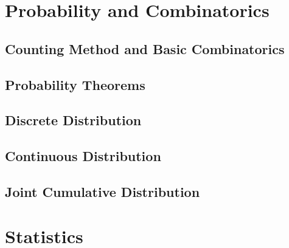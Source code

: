 \documentclass[
	12pt, %
	fleqn, %
	a4paper, %
]{LegrandOrangeBook}
\begin{document}
\part{Probability and Combinatorics}

\chapterspaceabove{6.75cm} 
\chapterspacebelow{7.25cm} 
\chapter{Counting Method and Basic Combinatorics}


\chapterspaceabove{6.75cm} 
\chapterspacebelow{7.25cm} 
\chapter{Probability Theorems}


\chapterspaceabove{6.75cm} 
\chapterspacebelow{7.25cm} 
\chapter{Discrete Distribution}


\chapterspaceabove{6.75cm} 
\chapterspacebelow{7.25cm} 
\chapter{Continuous Distribution}


\chapterspaceabove{6.75cm} 
\chapterspacebelow{7.25cm} 
\chapter{Joint Cumulative Distribution}
\part{Statistics}



\stopcontents[part] %
\end{document}
